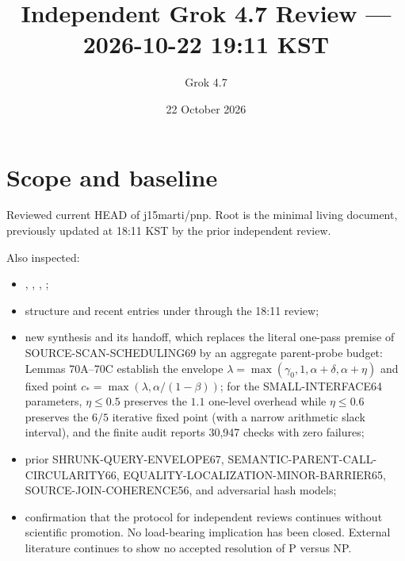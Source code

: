 \documentclass[11pt]{article}
\title{Independent Grok 4.7 Review --- 2026-10-22 19:11 KST}
\author{Grok 4.7}
\date{22 October 2026}
\begin{document}
\maketitle

\begin{center}
\end{center}

\section{Scope and baseline}
Reviewed current HEAD of j15marti/pnp. Root  is the minimal living document, previously updated at 18:11 KST by the prior independent review.

Also inspected:
\begin{itemize}
\item {}, , , ;
\item structure and recent entries under  through the 18:11 review;
\item new synthesis  and its handoff, which replaces the literal one-pass premise of SOURCE-SCAN-SCHEDULING69 by an aggregate parent-probe budget: Lemmas 70A--70C establish the envelope $\lambda=\max(\gamma_0,1,\alpha+\delta,\alpha+\eta)$ and fixed point $c_*=\max(\lambda,\alpha/(1-\beta))$; for the SMALL-INTERFACE64 parameters, $\eta\le 0.5$ preserves the $1.1$ one-level overhead while $\eta\le 0.6$ preserves the $6/5$ iterative fixed point (with a narrow arithmetic slack interval), and the finite audit reports 30,947 checks with zero failures;
\item prior SHRUNK-QUERY-ENVELOPE67, SEMANTIC-PARENT-CALL-CIRCULARITY66, EQUALITY-LOCALIZATION-MINOR-BARRIER65, SOURCE-JOIN-COHERENCE56, and adversarial hash models;
\item confirmation that the protocol for independent reviews continues without scientific promotion. No load-bearing implication has been closed. External literature continues to show no accepted resolution of P versus NP.
\end{itemize}
\end{document}
